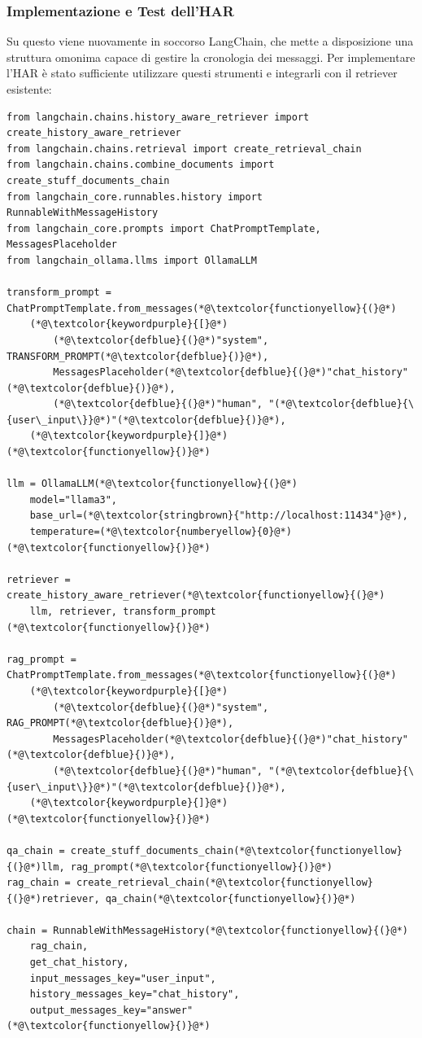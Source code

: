 \subsubsection{Implementazione e Test dell'HAR}
Su questo viene nuovamente in soccorso LangChain, che mette a disposizione una struttura omonima capace di gestire la cronologia dei messaggi. Per implementare l'HAR è stato sufficiente utilizzare questi strumenti e integrarli con il retriever esistente:
\begin{lstlisting}[label=lst:har, caption={Implementazione dell'History Aware Retriever}]
from langchain.chains.history_aware_retriever import create_history_aware_retriever
from langchain.chains.retrieval import create_retrieval_chain
from langchain.chains.combine_documents import create_stuff_documents_chain
from langchain_core.runnables.history import RunnableWithMessageHistory
from langchain_core.prompts import ChatPromptTemplate, MessagesPlaceholder
from langchain_ollama.llms import OllamaLLM

transform_prompt = ChatPromptTemplate.from_messages(*@\textcolor{functionyellow}{(}@*)
    (*@\textcolor{keywordpurple}{[}@*)
        (*@\textcolor{defblue}{(}@*)"system", TRANSFORM_PROMPT(*@\textcolor{defblue}{)}@*),
        MessagesPlaceholder(*@\textcolor{defblue}{(}@*)"chat_history"(*@\textcolor{defblue}{)}@*),
        (*@\textcolor{defblue}{(}@*)"human", "(*@\textcolor{defblue}{\{user\_input\}}@*)"(*@\textcolor{defblue}{)}@*),
    (*@\textcolor{keywordpurple}{]}@*)
(*@\textcolor{functionyellow}{)}@*)

llm = OllamaLLM(*@\textcolor{functionyellow}{(}@*)
    model="llama3",
    base_url=(*@\textcolor{stringbrown}{"http://localhost:11434"}@*),
    temperature=(*@\textcolor{numberyellow}{0}@*)
(*@\textcolor{functionyellow}{)}@*)

retriever = create_history_aware_retriever(*@\textcolor{functionyellow}{(}@*)
    llm, retriever, transform_prompt
(*@\textcolor{functionyellow}{)}@*)

rag_prompt = ChatPromptTemplate.from_messages(*@\textcolor{functionyellow}{(}@*)
    (*@\textcolor{keywordpurple}{[}@*)
        (*@\textcolor{defblue}{(}@*)"system", RAG_PROMPT(*@\textcolor{defblue}{)}@*),
        MessagesPlaceholder(*@\textcolor{defblue}{(}@*)"chat_history"(*@\textcolor{defblue}{)}@*),
        (*@\textcolor{defblue}{(}@*)"human", "(*@\textcolor{defblue}{\{user\_input\}}@*)"(*@\textcolor{defblue}{)}@*),
    (*@\textcolor{keywordpurple}{]}@*)
(*@\textcolor{functionyellow}{)}@*)

qa_chain = create_stuff_documents_chain(*@\textcolor{functionyellow}{(}@*)llm, rag_prompt(*@\textcolor{functionyellow}{)}@*)
rag_chain = create_retrieval_chain(*@\textcolor{functionyellow}{(}@*)retriever, qa_chain(*@\textcolor{functionyellow}{)}@*)

chain = RunnableWithMessageHistory(*@\textcolor{functionyellow}{(}@*)
    rag_chain,
    get_chat_history,
    input_messages_key="user_input",
    history_messages_key="chat_history",
    output_messages_key="answer"
(*@\textcolor{functionyellow}{)}@*)
\end{lstlisting}
